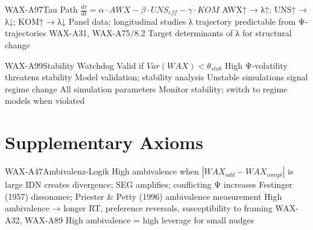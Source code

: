 \begin{axiomspec}{WAX-A97}{Tau Path}
 $\frac{d\tau}{dt} = \alpha \cdot AWX - \beta \cdot UNS_{eff} - \gamma \cdot KOM$
 AWX↑ → λ↑; UNS↑ → λ↓; KOM↑ → λ↓
 Panel data; longitudinal studies
 λ trajectory predictable from Ψ-trajectories
 WAX-A31, WAX-A75/8.2
 Target determinants of λ for structural change
\end{axiomspec}

\begin{axiomspec}{WAX-A99}{Stability Watchdog}
 Valid if $Var(WAX) < \theta_{stab}$
 High Ψ-volatility threatens stability
 Model validation; stability analysis
 Unstable simulations signal regime change
 All simulation parameters
 Monitor stability; switch to regime models when violated
\end{axiomspec}



\section{Supplementary Axioms}
\label{sec:av-supplementary}




\begin{axiomspec}{WAX-A47}{Ambivalenz-Logik}
 High ambivalence when $|WAX_{add} - WAX_{compl}|$ is large
 IDN creates divergence; SEG amplifies; conflicting Ψ increases
 Festinger (1957) dissonance; Priester \& Petty (1996) ambivalence measurement
 High ambivalence → longer RT, preference reversals, susceptibility to framing
 WAX-A32, WAX-A89
 High ambivalence = high leverage for small nudges
\end{axiomspec}


